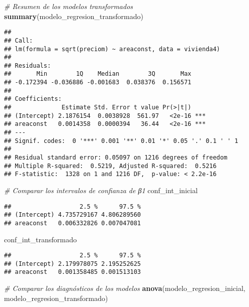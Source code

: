 \documentclass[
]{article}
\newenvironment{Shaded}{\begin{snugshade}}{\end{snugshade}}
\newcommand{\CommentTok}[1]{\textcolor[rgb]{0.56,0.35,0.01}{\textit{#1}}}
\newcommand{\FunctionTok}[1]{\textcolor[rgb]{0.13,0.29,0.53}{\textbf{#1}}}
\newcommand{\NormalTok}[1]{#1}
\begin{document}
\begin{Shaded}
\begin{Highlighting}[]
\CommentTok{\# Resumen de los modelos transformados}
\FunctionTok{summary}\NormalTok{(modelo\_regresion\_transformado)}
\end{Highlighting}
\end{Shaded}

\begin{verbatim}
## 
## Call:
## lm(formula = sqrt(preciom) ~ areaconst, data = vivienda4)
## 
## Residuals:
##       Min        1Q    Median        3Q       Max 
## -0.172394 -0.036886 -0.001683  0.038376  0.156571 
## 
## Coefficients:
##              Estimate Std. Error t value Pr(>|t|)    
## (Intercept) 2.1876154  0.0038928  561.97   <2e-16 ***
## areaconst   0.0014358  0.0000394   36.44   <2e-16 ***
## ---
## Signif. codes:  0 '***' 0.001 '**' 0.01 '*' 0.05 '.' 0.1 ' ' 1
## 
## Residual standard error: 0.05097 on 1216 degrees of freedom
## Multiple R-squared:  0.5219, Adjusted R-squared:  0.5216 
## F-statistic:  1328 on 1 and 1216 DF,  p-value: < 2.2e-16
\end{verbatim}

\begin{Shaded}
\begin{Highlighting}[]
\CommentTok{\# Comparar los intervalos de confianza de β1}
\NormalTok{conf\_int\_inicial}
\end{Highlighting}
\end{Shaded}

\begin{verbatim}
##                   2.5 %      97.5 %
## (Intercept) 4.735729167 4.806289560
## areaconst   0.006332826 0.007047081
\end{verbatim}

\begin{Shaded}
\begin{Highlighting}[]
\NormalTok{conf\_int\_transformado}
\end{Highlighting}
\end{Shaded}

\begin{verbatim}
##                   2.5 %      97.5 %
## (Intercept) 2.179978075 2.195252625
## areaconst   0.001358485 0.001513103
\end{verbatim}

\begin{Shaded}
\begin{Highlighting}[]
\CommentTok{\# Comparar los diagnósticos de los modelos}
\FunctionTok{anova}\NormalTok{(modelo\_regresion\_inicial, modelo\_regresion\_transformado)}
\end{Highlighting}
\end{Shaded}
\end{document}
